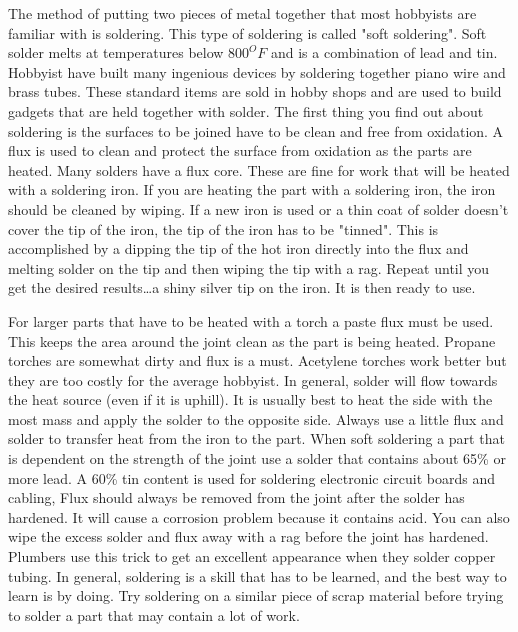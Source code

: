 \secup

\secdown


The method of putting two pieces of metal together that most hobbyists are
familiar with is soldering. This type of soldering is called "soft soldering".
Soft solder melts at temperatures below $800^{O}F$ and is a combination of lead
and tin. Hobbyist have built many ingenious devices by soldering together piano
wire and brass tubes. These standard items are sold in hobby shops and are used
to build gadgets that are held together with solder. The first thing you find
out about soldering is the surfaces to be joined have to be clean and free from
oxidation. A flux is used to clean and protect the surface from oxidation as the
parts are heated. Many solders have a flux core. These are fine for work that
will be heated with a soldering iron. If you are heating the part with a
soldering iron, the iron should be cleaned by wiping. If a new iron is used or a
thin coat of solder doesn't cover the tip of the iron, the tip of the iron has
to be "tinned". This is accomplished by a dipping the tip of the hot iron
directly into the flux and melting solder on the tip and then wiping the tip
with a rag. Repeat until you get the desired results\ldots a shiny silver tip on
the iron. It is then ready to use.


For larger parts that have to be heated with a torch a paste flux must be used.
This keeps the area around the joint clean as the part is being heated. Propane
torches are somewhat dirty and flux is a must. Acetylene torches work better but
they are too costly for the average hobbyist. In general, solder will flow
towards the heat source (even if it is uphill). It is usually best to heat the
side with the most mass and apply the solder to the opposite side. Always use a
little flux and solder to transfer heat from the iron to the part. When soft
soldering a part that is dependent on the strength of the joint use a solder
that contains about 65\% or more lead. A 60\% tin content is used for soldering
electronic circuit boards and cabling, Flux should always be removed from the
joint after the solder has hardened. It will cause a corrosion problem because
it contains acid. You can also wipe the excess solder and flux away with a rag
before the joint has hardened. Plumbers use this trick to get an excellent
appearance when they solder copper tubing. In general, soldering is a skill that
has to be learned, and the best way to learn is by doing. Try soldering on a
similar piece of scrap material before trying to solder a part that may contain
a lot of work.

